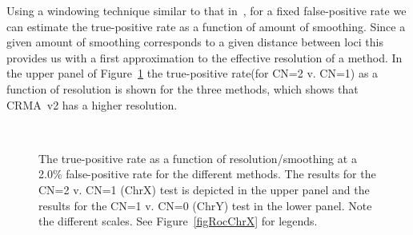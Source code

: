 \documentclass{bioinfo}
\newcommand{\TPrate}{true-positive rate\xspace}
\newcommand{\FPrate}{false-positive rate\xspace}
\begin{document}
Using a windowing technique similar to that in~\citet{BengtssonH_etal_2008}, for a fixed \FPrate we can estimate the \TPrate as a function of amount of smoothing.  Since a given amount of smoothing corresponds to a given distance between loci this provides us with a first approximation to the effective resolution of a method.  In the upper panel of Figure~\ref{figTPvResolutionChrXY} the \TPrate (for CN=2 v. CN=1) as a function of resolution is shown for the three methods, which shows that CRMA~v2 has a higher resolution.
\begin{figure}[!tpbh]
\begin{center}
   \\
\end{center}
 \caption{
   The \TPrate as a function of resolution/smoothing at a 2.0\% \FPrate for the different methods.
   The results for the CN=2 v. CN=1 (ChrX) test is depicted in the upper panel
   and the results for the CN=1 v. CN=0 (ChrY) test in the lower panel.
   Note the different scales.  See Figure~\ref{figRocChrX} for legends.
 }
 \label{figTPvResolutionChrXY}
\end{figure}
\end{document}

